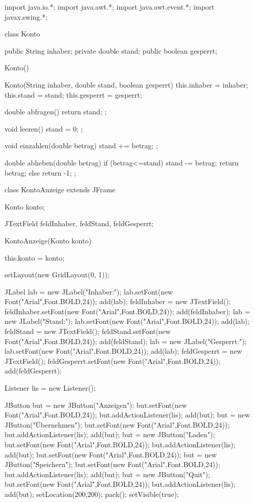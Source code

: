 \begin{mycodebox}[caption={Codelisting über mehrere Seiten},label={lst:CodelistMultipage},language=Java]

import java.io.*;
import java.awt.*;
import java.awt.event.*;
import javax.swing.*;

class Konto {

 public String inhaber;
 private double stand;
 public boolean gesperrt;
 
 Konto() { }
 
 Konto(String inhaber, double stand, boolean gesperrt) {
  this.inhaber = inhaber;
  this.stand = stand;
  this.gesperrt = gesperrt;
 }

 double abfragen() {
  return stand;
 };

 void leeren() {
   stand = 0;
 };

 void einzahlen(double betrag) {
   stand += betrag;
 };

 double abheben(double betrag) {
  if (betrag<=stand)
   { stand -= betrag;
     return betrag; }
  else return -1;
 };

}

class KontoAnzeige extends JFrame {

 Konto konto;
 
 JTextField feldInhaber, feldStand, feldGesperrt;
 
 KontoAnzeige(Konto konto) {

  this.konto = konto;
  
  setLayout(new GridLayout(0, 1));

  JLabel lab = new JLabel("Inhaber:");
  lab.setFont(new Font("Arial",Font.BOLD,24));
  add(lab);
  feldInhaber = new JTextField();
  feldInhaber.setFont(new Font("Arial",Font.BOLD,24));
  add(feldInhaber);
  lab = new JLabel("Stand:");
  lab.setFont(new Font("Arial",Font.BOLD,24));
  add(lab);
  feldStand = new JTextField();
  feldStand.setFont(new Font("Arial",Font.BOLD,24));
  add(feldStand);
  lab = new JLabel("Gesperrt:");
  lab.setFont(new Font("Arial",Font.BOLD,24));
  add(lab);
  feldGesperrt = new JTextField();
  feldGesperrt.setFont(new Font("Arial",Font.BOLD,24));
  add(feldGesperrt);
  
  Listener lis = new Listener();
  
  JButton but = new JButton("Anzeigen");
  but.setFont(new Font("Arial",Font.BOLD,24));
  but.addActionListener(lis);
  add(but);
  but = new JButton("Übernehmen");
  but.setFont(new Font("Arial",Font.BOLD,24));
  but.addActionListener(lis);
  add(but);
  but = new JButton("Laden");
  but.setFont(new Font("Arial",Font.BOLD,24));
  but.addActionListener(lis);
  add(but);
  but.setFont(new Font("Arial",Font.BOLD,24));
  but = new JButton("Speichern");
  but.setFont(new Font("Arial",Font.BOLD,24));
  but.addActionListener(lis);
  add(but);
  but = new JButton("Quit");
  but.setFont(new Font("Arial",Font.BOLD,24));
  but.addActionListener(lis);
  add(but);
  setLocation(200,200);
  pack();
  setVisible(true);
 }
 
}
\end{mycodebox}
